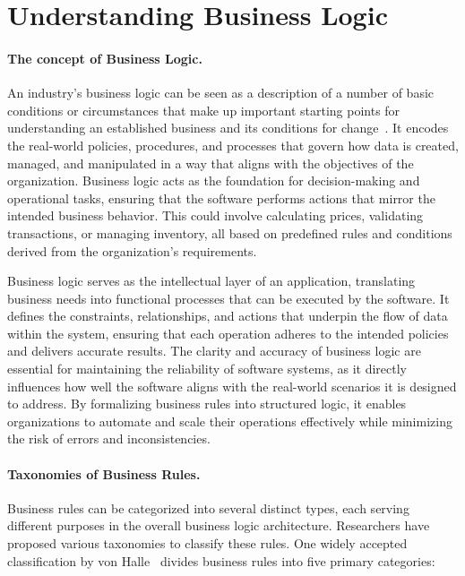 \section{Understanding Business Logic}

\paragraph{The concept of Business Logic.} An industry's business logic can be seen as a description of a number of basic conditions or circumstances that make up important starting points for understanding an established business and its conditions for change~\cite{BusinessRules}. It encodes the real-world policies, procedures, and processes that govern how data is created, managed, and manipulated in a way that aligns with the objectives of the organization. Business logic acts as the foundation for decision-making and operational tasks, ensuring that the software performs actions that mirror the intended business behavior. This could involve calculating prices, validating transactions, or managing inventory, all based on predefined rules and conditions derived from the organization's requirements.

\hspace{0.5cm}Business logic serves as the intellectual layer of an application, translating business needs into functional processes that can be executed by the software. It defines the constraints, relationships, and actions that underpin the flow of data within the system, ensuring that each operation adheres to the intended policies and delivers accurate results. The clarity and accuracy of business logic are essential for maintaining the reliability of software systems, as it directly influences how well the software aligns with the real-world scenarios it is designed to address. By formalizing business rules into structured logic, it enables organizations to automate and scale their operations effectively while minimizing the risk of errors and inconsistencies.

\paragraph{Taxonomies of Business Rules.} Business rules can be categorized into several distinct types, each serving different purposes in the overall business logic architecture. Researchers have proposed various taxonomies to classify these rules. One widely accepted classification by von Halle~\cite{BusinessRulesTaxonomy} divides business rules into five primary categories:

